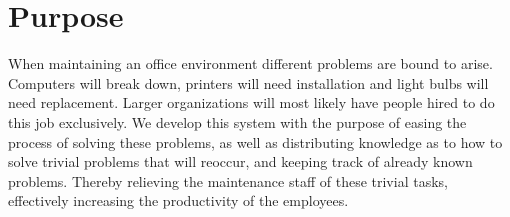\section{Purpose}
When maintaining an office environment different problems are bound to arise. Computers will break down, printers will need installation and light bulbs will need replacement. Larger organizations will most likely have people hired to do this job exclusively. We develop this system with the purpose of easing the process of solving these problems, as well as distributing knowledge as to how to solve trivial problems that will reoccur, and keeping track of already known problems. Thereby relieving the maintenance staff of these trivial tasks, effectively increasing the productivity of the employees.
